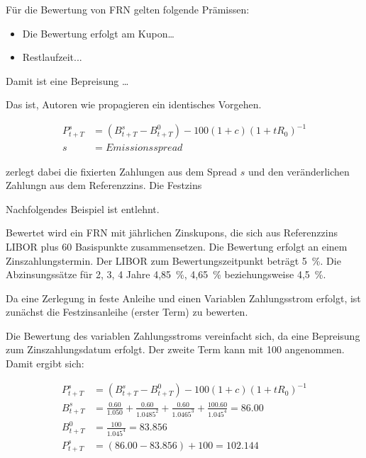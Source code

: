 \documentclass[12pt, a4paper]{article}
\theoremstyle{plain}
\begin{document}
Für die Bewertung von \gls{FRN} gelten folgende Prämissen:
\begin{itemize}
	\item Die Bewertung erfolgt am Kupon\dots
	\item Restlaufzeit...
\end{itemize}



Damit ist eine Bepreisung \dots

Das ist, Autoren wie \textcite{veronesi_fixed_2010} propagieren ein identisches Vorgehen.

\begin{align*}
	P_{t+T}^{s}&=\left(B_{t+T}^{s}-B_{t+T}^{0}\right)-100(1+c)\left(1+t R_{0}\right)^{-1}\\
	s&= Emissionsspread
\end{align*}

\textcite[][]{alexander_market_2008} zerlegt dabei die fixierten Zahlungen aus dem Spread $s$ und den veränderlichen Zahlungn aus dem Referenzzins. Die Festzins

Nachfolgendes Beispiel ist \textcite[][32]{alexander_market_2008} entlehnt.

Bewertet wird ein \gls{FRN} mit jährlichen Zinskupons, die sich aus Referenzzins \gls{LIBOR} plus 60 Basispunkte zusammensetzen. Die Bewertung erfolgt an einem Zinszahlungstermin. Der \gls{LIBOR} zum Bewertungszeitpunkt beträgt 5~\%. Die Abzinsungssätze für 2, 3, 4 Jahre 4,85~\%, 4,65~\% beziehungsweise 4,5~\%.

Da eine Zerlegung in feste Anleihe und einen Variablen Zahlungsstrom erfolgt, ist zunächst die Festzinsanleihe (erster Term) zu bewerten.

Die Bewertung des variablen Zahlungsstroms vereinfacht sich, da eine Bepreisung zum Zinszahlungsdatum erfolgt. Der zweite Term kann mit 100 angenommen. Damit ergibt sich:

\begin{align*}
	P_{t+T}^{s}&=\left(B_{t+T}^{s}-B_{t+T}^{0}\right)-100(1+c)\left(1+t R_{0}\right)^{-1}\\
	B_{t+T}^{s}&=\frac{0.60}{1.050}+\frac{0.60}{1.0485^2}+\frac{0.60}{1.0465^3}+\frac{100.60}{1.045^4}=86.00\\
	B_{t+T}^{0}&=\frac{100}{1.045^4}=83.856\\
	P_{t+T}^{s}&= (86.00-83.856) + 100 = 102.144\\
\end{align*}
\end{document}
